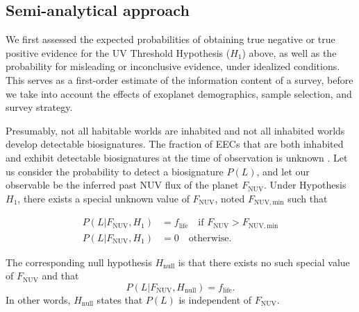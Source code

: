 \documentclass[twocolumn,twocolappendix,linenumbers]{aastex631}
\begin{document}
\subsection{Semi-analytical approach}\label{sec:met-semianalytical}
We first assessed the expected probabilities of obtaining true negative or true positive evidence for the UV Threshold Hypothesis ($H_1$) above, as well as the probability for misleading or inconclusive evidence, under idealized conditions.
This serves as a first-order estimate of the information content of a survey, before we take into account the effects of exoplanet demographics, sample selection, and survey strategy.

Presumably, not all habitable worlds are inhabited and not all inhabited worlds develop detectable biosignatures.
The fraction of \glspl{EEC} that are both inhabited and exhibit detectable biosignatures at the time of observation is unknown 
 .
Let us consider the probability to detect a biosignature $P(L)$, and let our observable be the inferred past \gls{NUV} flux of the planet $F_\mathrm{NUV}$.
Under Hypothesis $H_1$, there exists a special unknown value of $F_\mathrm{NUV}$, noted $F_\mathrm{NUV, min}$ such that

\begin{align}
    P(L|F_\mathrm{NUV},H_1) &=  f_\mathrm{life} \quad \text{if } F_\mathrm{NUV}>F_\mathrm{NUV, min}\\
    P(L|F_\mathrm{NUV},H_1) &=  0               \quad  \text{otherwise.}
\end{align}

The corresponding null hypothesis $H_\mathrm{null}$ is that there exists no such special value of $F_\mathrm{NUV}$ and that
\begin{equation}
P(L|F_\mathrm{NUV},H_\mathrm{null}) = f_\mathrm{life}.
\end{equation}
In other words, $H_\mathrm{null}$ states that $P(L)$ is independent of $F_\mathrm{NUV}$.
\end{document}
